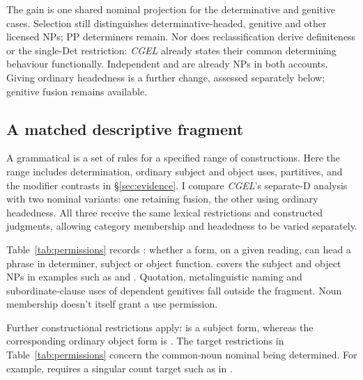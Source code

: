 \documentclass[12pt]{article}
\begin{document}
The gain is one shared nominal projection for the determinative and genitive cases. Selection still distinguishes determinative-headed, genitive and other licensed NPs; PP determiners remain. Nor does reclassification derive definiteness or the single-Det restriction: \textit{CGEL} already states their common determining behaviour functionally. Independent  and  are already NPs in both accounts. Giving  ordinary headedness is a further change, assessed separately below; genitive fusion remains available.

\subsection{A matched descriptive fragment}\label{sec:fragment}

A grammatical  is a set of rules for a specified range of constructions. Here the range includes determination, ordinary subject and object uses, partitives, and the modifier contrasts in §\ref{sec:evidence}. I compare \textit{CGEL}'s separate-D analysis with two nominal variants: one retaining fusion, the other using ordinary headedness. All three receive the same lexical restrictions and constructed judgments, allowing category membership and headedness to be varied separately.

Table~\ref{tab:permissions} records : whether a form, on a given reading, can head a phrase in determiner, subject or object function.  covers the subject and object NPs in examples such as  and . Quotation, metalinguistic naming and subordinate-clause uses of dependent genitives fall outside the fragment. Noun membership doesn't itself grant a use permission.

Further constructional restrictions apply:  is a subject form, whereas the corresponding ordinary object form is . The target restrictions in Table~\ref{tab:permissions} concern the common-noun nominal being determined. For example,  requires a singular count target such as  in .
\end{document}
